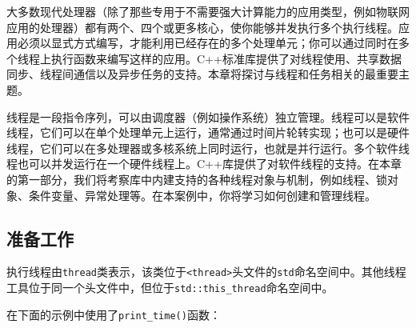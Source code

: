 
大多数现代处理器（除了那些专用于不需要强大计算能力的应用类型，例如物联网应用的处理器）都有两个、四个或更多核心，使你能够并发执行多个执行线程。应用必须以显式方式编写，才能利用已经存在的多个处理单元；你可以通过同时在多个线程上执行函数来编写这样的应用。C++标准库提供了对线程使用、共享数据同步、线程间通信以及异步任务的支持。本章将探讨与线程和任务相关的最重要主题。



线程是一段指令序列，可以由调度器（例如操作系统）独立管理。线程可以是软件线程，它们可以在单个处理单元上运行，通常通过时间片轮转实现；也可以是硬件线程，它们可以在多处理器或多核系统上同时运行，也就是并行运行。多个软件线程也可以并发运行在一个硬件线程上。C++库提供了对软件线程的支持。在本章的第一部分，我们将考察库中内建支持的各种线程对象与机制，例如线程、锁对象、条件变量、异常处理等。在本案例中，你将学习如何创建和管理线程。



\subsection{准备工作}



执行线程由\texttt{thread}类表示，该类位于\texttt{<\allowbreak{}thread>}头文件的\texttt{std}命名空间中。其他线程工具位于同一个头文件中，但位于\texttt{std::\allowbreak{}this\_\allowbreak{}thread}命名空间中。



在下面的示例中使用了\texttt{print\_\allowbreak{}time()}函数：



